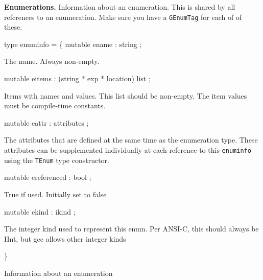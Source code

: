 \documentclass[11pt]{article}
\begin{document}
{\bf Enumerations.} Information about an enumeration. This is shared by all 
 references to an enumeration. Make sure you have a {\tt{GEnumTag}} for each of 
 of these.



\label{type:Cil.enuminfo}\begin{ocamldoccode}
type enuminfo = \{
  mutable ename : string ;
\end{ocamldoccode}
\begin{ocamldoccomment}
The name. Always non-empty.
\end{ocamldoccomment}
\begin{ocamldoccode}
  mutable eitems : (string * exp * location) list ;
\end{ocamldoccode}
\begin{ocamldoccomment}
Items with names and values. This list should be non-empty. The item 
 values must be compile-time constants.
\end{ocamldoccomment}
\begin{ocamldoccode}
  mutable eattr : attributes ;
\end{ocamldoccode}
\begin{ocamldoccomment}
The attributes that are defined at the same time as the enumeration 
 type. These attributes can be supplemented individually at each 
 reference to this {\tt{enuminfo}} using the {\tt{TEnum}} type constructor.
\end{ocamldoccomment}
\begin{ocamldoccode}
  mutable ereferenced : bool ;
\end{ocamldoccode}
\begin{ocamldoccomment}
True if used. Initially set to false
\end{ocamldoccomment}
\begin{ocamldoccode}
  mutable ekind : ikind ;
\end{ocamldoccode}
\begin{ocamldoccomment}
The integer kind used to represent this enum. Per ANSI-C, this
 should always be IInt, but gcc allows other integer kinds
\end{ocamldoccomment}
\begin{ocamldoccode}
\}
\end{ocamldoccode}
\begin{ocamldocdescription}
Information about an enumeration


\end{ocamldocdescription}
\end{document}
